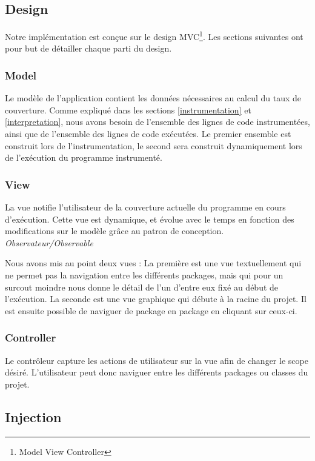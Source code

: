 \subsection{Design}

Notre implémentation est conçue sur le design MVC\footnote{Model View Controller}. Les sections suivantes ont pour but de détailler chaque parti du design.

\subsubsection{Model}

Le modèle de l'application contient les données nécessaires au calcul du taux de couverture. Comme expliqué dans les sections \ref{instrumentation} et \ref{interpretation}, nous avons besoin de l'ensemble des lignes de code instrumentées, ainsi que de l'ensemble des lignes de code exécutées. Le premier ensemble est construit lors de l'instrumentation, le second sera construit dynamiquement lors de l'exécution du programme instrumenté.

\subsubsection{View}

La vue notifie l'utilisateur de la couverture actuelle du programme en cours d'exécution. Cette vue est dynamique, et évolue avec le temps en fonction des modifications sur le modèle grâce au patron de conception. \textit{Observateur/Observable}
\\
\par Nous avons mis au point deux vues :
La première est une vue textuellement qui ne permet pas la navigation entre les différents packages, mais qui pour un surcout moindre nous donne le détail de l'un d'entre eux fixé au début de l'exécution.
La seconde est une vue graphique qui débute à la racine du projet. Il est ensuite possible de naviguer de package en package en cliquant sur ceux-ci.

\subsubsection{Controller}

Le contrôleur capture les actions de utilisateur sur la vue afin de changer le scope désiré. L'utilisateur peut donc naviguer entre les différents packages ou classes du projet.

\subsection{Injection}

